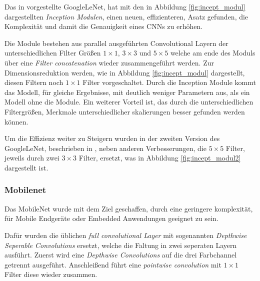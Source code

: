 Das in \cite{szegedyGoingDeeperConvolutions2014} 
vorgestellte GoogleLeNet, hat mit den in 
Abbildung \ref{fig:incept_modul} dargestellten
\textit{Inception Modulen}, einen neuen, 
effizienteren, Asatz gefunden, die 
Komplexität und damit die Genauigkeit eines 
CNNs zu erhöhen.

Die Module bestehen aus parallel ausgeführten 
Convolutional Layern der unterschiedlichen Filter 
Größen $1\times1$, $3\times3$ und $5\times5$ welche 
am ende des Moduls über eine \textit{Filter 
concatenation} wieder zusammengeführt werden.
Zur Dimensionsreduktion werden, wie in 
Abbildung \ref{fig:incept_modul} dargestellt,
diesen Filtern noch $1\times1$ Filter vorgeschaltet.
Durch die Inception Module kommt das Modell, 
für gleiche Ergebnisse, mit deutlich weniger 
Parametern aus, als ein Modell ohne die Module.
Ein weiterer Vorteil ist, das durch die 
unterschiedlichen Filtergrößen, Merkmale 
unterschiedlicher skalierungen besser gefunden 
werden können.

Um die Effizienz weiter zu Steigern wurden in 
der zweiten Version des GoogleLeNet, beschrieben in
\cite{szegedyRethinkingInceptionArchitecture2015},
neben anderen Verbesserungen, die 
$5\times5$ Filter, jeweils durch zwei $3\times3$ Filter, 
ersetzt, was in Abbildung \ref{fig:incept_modul2}
dargestellt ist.

\vspace{1cm}
\begin{minipage}{0.45\textwidth}
    \centering
    
    \label{fig:incept_modul}
\end{minipage}
\begin{minipage}{0.1\textwidth}
    \hfill
\end{minipage}
\begin{minipage}{0.45\textwidth}
    \centering
    
    \label{fig:incept_modul2}
\end{minipage}


\newpage
\subsubsection{Mobilenet}
Das MobileNet \cite{howardMobileNetsEfficientConvolutional2017a}
wurde mit dem Ziel geschaffen, durch eine geringere 
komplexität, für Mobile Endgeräte oder Embedded Anwendungen 
geeignet zu sein.

Dafür wurden die üblichen \textit{full convolutional Layer}
mit sogenannten \textit{Depthwise Seperable 
Convolutions} ersetzt, welche die Faltung in zwei seperaten 
Layern ausführt. Zuerst wird eine \textit{Depthwise  
Convolutions} auf die drei Farbchannel getrennt ausgeführt.
Anschleißend führt eine \textit{pointwise convolution}
mit $1\times1$ Filter diese wieder zusammen.



